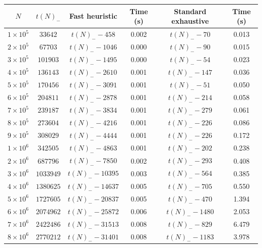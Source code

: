 \documentclass[12pt,a4paper,reqno]{amsart}
\numberwithin{equation}{section}
\theoremstyle{plain}
\theoremstyle{definition}
\begin{document}
      
\begin{table}[htp!]
  \centering
  \begin{tabular}{|c|c|c|c|c|c|}
  \hline
\rule{0pt}{11pt}  $N$ & $t(N)_-$ & Fast heuristic & Time (s) & Standard exhaustive & Time (s) \\
  \hline
\rule{0pt}{12pt}$1 \times 10^5$ & $\num{33642}$ & $t(N)_- - \num{458}$ & 0.002 & $t(N)_- - \num{70}$ & 0.013 \\
$2 \times 10^5$ & $\num{67703}$ & $t(N)_- - \num{1046}$ & 0.000 & $t(N)_- - \num{90}$ & 0.015 \\
$3 \times 10^5$ & $\num{101903}$ & $t(N)_- - \num{1495}$ & 0.000 & $t(N)_- - \num{54}$ & 0.023 \\
$4 \times 10^5$ & $\num{136143}$ & $t(N)_- - \num{2610}$ & 0.001 & $t(N)_- - \num{147}$ & 0.036 \\
$5 \times 10^5$ & $\num{170456}$ & $t(N)_- - \num{3091}$ & 0.001 & $t(N)_- - \num{51}$ & 0.050 \\
$6 \times 10^5$ & $\num{204811}$ & $t(N)_- - \num{2878}$ & 0.001 & $t(N)_- - \num{214}$ & 0.058 \\
$7 \times 10^5$ & $\num{239187}$ & $t(N)_- - \num{3834}$ & 0.001 & $t(N)_- - \num{279}$ & 0.061 \\
$8 \times 10^5$ & $\num{273604}$ & $t(N)_- - \num{4216}$ & 0.001 & $t(N)_- - \num{226}$ & 0.086 \\
$9 \times 10^5$ & $\num{308029}$ & $t(N)_- - \num{4444}$ & 0.001 & $t(N)_- - \num{226}$ & 0.172 \\\hline
\rule{0pt}{12pt}$1 \times 10^6$ & $\num{342505}$ & $t(N)_- - \num{4863}$ & 0.001 & $t(N)_- - \num{202}$ & 0.238 \\
$2 \times 10^6$ & $\num{687796}$ & $t(N)_- - \num{7850}$ & 0.002 & $t(N)_- - \num{293}$ & 0.408 \\
$3 \times 10^6$ & $\num{1033949}$ & $t(N)_- - \num{10395}$ & 0.003 & $t(N)_- - \num{564}$ & 0.385 \\
$4 \times 10^6$ & $\num{1380625}$ & $t(N)_- - \num{14637}$ & 0.005 & $t(N)_- - \num{705}$ & 0.550 \\
$5 \times 10^6$ & $\num{1727605}$ & $t(N)_- - \num{20837}$ & 0.005 & $t(N)_- - \num{470}$ & 1.394 \\
$6 \times 10^6$ & $\num{2074962}$ & $t(N)_- - \num{25872}$ & 0.006 & $t(N)_- - \num{1480}$ & 2.053 \\
$7 \times 10^6$ & $\num{2422486}$ & $t(N)_- - \num{31513}$ & 0.008 & $t(N)_- - \num{829}$ & 6.479 \\
$8 \times 10^6$ & $\num{2770212}$ & $t(N)_- - \num{31401}$ & 0.008 & $t(N)_- - \num{1183}$ & 3.978 \\

\end{tabular}
\end{table}
\end{document}
